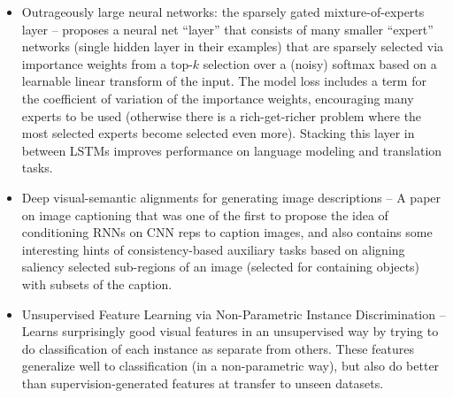 \documentclass[10pt]{article}
\begin{document}
\begin{itemize}
\item Outrageously large neural networks: the sparsely gated mixture-of-experts layer -- proposes a neural net ``layer'' that consists of many smaller ``expert'' networks (single hidden layer in their examples) that are sparsely selected via importance weights from a top-$k$ selection over a (noisy) softmax based on a learnable linear transform of the input. The model loss includes a term for the coefficient of variation of the importance weights, encouraging many experts to be used (otherwise there is a rich-get-richer problem where the most selected experts become selected even more). Stacking this layer in between LSTMs improves performance on language modeling and translation tasks. \citep{Shazeer2017} 
\item Deep visual-semantic alignments for generating image descriptions -- A paper on image captioning that was one of the first to propose the idea of conditioning RNNs on CNN reps to caption images, and also contains some interesting hints of consistency-based auxiliary tasks based on aligning saliency selected sub-regions of an image (selected for containing objects) with subsets of the caption. \citep{Karpathy2017} 
\item Unsupervised Feature Learning via Non-Parametric Instance Discrimination -- Learns surprisingly good visual features in an unsupervised way by trying to do classification of each instance as separate from others. These features generalize well to classification (in a non-parametric way), but also do better than supervision-generated features at transfer to unseen datasets. \citep{Wu2018}

\end{itemize}
\end{document}
